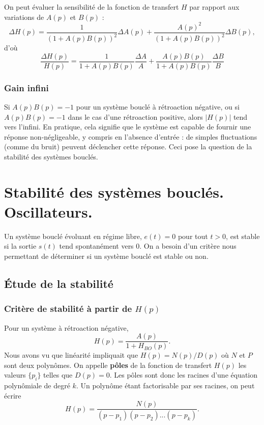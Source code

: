 \documentclass[11pt,a4paper]{report}
\begin{document}
On peut évaluer la sensibilité de la fonction de transfert $H$ par rapport aux variations de $A(p)$ et $B(p)$ :
\begin{equation}
	\Delta H(p) = \frac{1}{(1 + A(p)B(p))^2}\Delta A(p) + \frac{A(p)^2}{(1+A(p)B(p))^2}\Delta B(p),	
\end{equation}
d'où 
\begin{equation}
	\frac{\Delta H(p)}{H(p)} = \frac{1}{1+A(p)B(p)}\frac{\Delta A}{A} + \frac{A(p)B(p)}{1+A(p)B(p)}\frac{\Delta B}{B}
\end{equation}

\subsubsection{Gain infini}

Si $A(p)B(p) = -1$ pour un système bouclé à rétroaction négative, ou si $A(p)B(p) = -1$ dans le cas d'une rétroaction positive, alors $|H(p)|$ tend vers l'infini. En pratique, cela signifie que le système est capable de fournir une réponse non-négligeable, y compris en l'absence d'entrée : de simples fluctuations (comme du bruit) peuvent déclencher cette réponse. Ceci pose la question de la stabilité des systèmes bouclés.


\newpage
\section{Stabilité des systèmes bouclés. Oscillateurs.}

Un système bouclé évoluant en régime libre, $e(t) = 0$ pour tout $t > 0$, est stable si la sortie $s(t)$ tend spontanément vers 0. On a besoin d'un critère nous permettant de déterminer si un système bouclé est stable ou non.

\subsection{Étude de la stabilité}

\subsubsection{Critère de stabilité à partir de $H(p)$}

Pour un système à rétroaction négative, 
\begin{equation}
	H(p) = \frac{A(p)}{1 + H_{BO}(p)}.
\end{equation}
Nous avons vu que linéarité impliquait que $H(p) = N(p)/D(p)$ où $N$ et $P$ sont deux polynômes. On appelle \textbf{pôles} de la fonction de transfert $H(p)$ les valeurs $\{p_i\}$ telles que $D(p) = 0$. Les pôles sont donc les racines d'une équation polynômiale de degré $k$. Un polynôme étant factorisable par ses racines, on peut écrire
\begin{equation}
	H(p) = \frac{N(p)}{(p-p_1)(p-p_2)...(p - p_k)}.
\end{equation}
\end{document}

